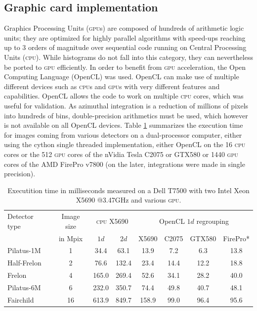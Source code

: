 \documentclass[a4paper]{jpconf}
\begin{document}
\subsection{Graphic card implementation}
Graphics Processing Units (\textsc{gpu}s) are composed of hundreds of
arithmetic logic units; they are optimized for highly
parallel algorithms with speed-ups reaching up to 3 orders of magnitude over sequential
code running on Central Processing Units (\textsc{cpu}).
While histograms do not fall into this category, they can nevertheless be
ported to \textsc{gpu} efficiently.
In order to benefit from \textsc{gpu} acceleration,
the Open Computing Language\cite{opencl} (OpenCL) was used. OpenCL can make use
of multiple different devices such as \textsc{cpu}s and \textsc{gpu}s with very
different features and capabilities.
OpenCL allows the code to work on multiple \textsc{cpu} cores, which was
useful for validation. 
As azimuthal integration is a reduction
of millions of pixels into hundreds of bins, double-precision arithmetics must
be used, which however is not available on all OpenCL devices.
Table \ref{perfs} summarizes the execution time for images coming from
various detectors on a dual-processor computer, either using the
cython single threaded implementation, either OpenCL on the 16
\textsc{cpu} cores or the 512 \textsc{gpu} cores of the nVidia Tesla C2075 or
GTX580 or 1440 \textsc{gpu} cores of the AMD FirePro v7800 (on the later,
integrations were made in single precision).

\begin{table}[h]
\begin{center}
\caption{\label{perfs}Executition time in milliseconds measured on a
Dell T7500 with two Intel Xeon X5690 @3.47GHz and various \textsc{gpu}.}

\begin{tabular}{|l|c||c|c||c|c|c|c|}
\hline
Detector type   & Image size 	& \multicolumn{2}{|c||}{\textsc{cpu} X5690}& \multicolumn{4}{|c|}{OpenCL $1d$ regrouping} \\
					& in Mpix		& $1d$	&	$2d$	&	X5690	&	C2075	&	GTX580	&	FirePro* \\
\hline
Pilatus-1M 			& 1  			& 34.4  &	63.1	&	13.9	&	7.2		&	6.3		&	13.8 \\
Half-Frelon 		& 2  			& 76.6  &   132.4   &	23.4	&	14.4	&	12.2	&	18.8 \\
Frelon 				& 4  			& 165.0	&	269.4   &	52.6	&	34.1	&	28.2	&	40.0 \\
Pilatus-6M 			& 6  			& 232.0	&	350.7	&	74.4	&	49.8	&	40.7	&	48.1 \\
Fairchild 			& 16 			& 613.9	&	849.7   &	158.9	&	99.0	&	96.4	&	95.6 \\
\hline
\end{tabular}
\end{center}
\end{table}
\end{document}
